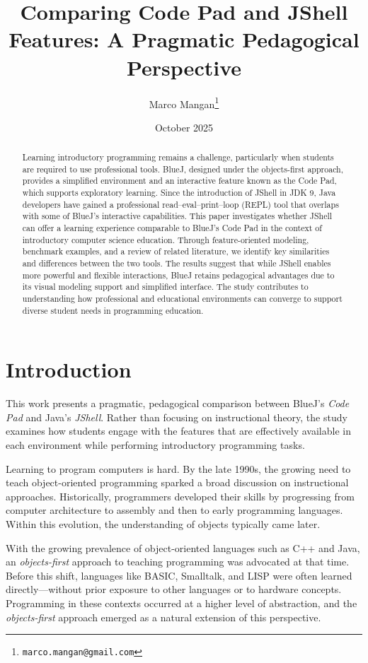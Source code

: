 \documentclass{article}
\title{Comparing Code Pad and JShell Features: A Pragmatic Pedagogical Perspective}
\author{Marco Mangan\thanks{\texttt{marco.mangan@gmail.com}}}
\date{October 2025}
\begin{document}
\maketitle

\begin{abstract}
Learning introductory programming remains a challenge, particularly when students are required to use professional tools. BlueJ, designed under the objects-first approach, provides a simplified environment and an interactive feature known as the Code Pad, which supports exploratory learning. Since the introduction of JShell in JDK 9, Java developers have gained a professional read–eval–print–loop (REPL) tool that overlaps with some of BlueJ’s interactive capabilities. This paper investigates whether JShell can offer a learning experience comparable to BlueJ’s Code Pad in the context of introductory computer science education. Through feature-oriented modeling, benchmark examples, and a review of related literature, we identify key similarities and differences between the two tools. The results suggest that while JShell enables more powerful and flexible interactions, BlueJ retains pedagogical advantages due to its visual modeling support and simplified interface. The study contributes to understanding how professional and educational environments can converge to support diverse student needs in programming education.
\end{abstract}

\section{Introduction}

This work presents a pragmatic, pedagogical comparison between BlueJ’s \textit{Code Pad} and Java’s \textit{JShell}. Rather than focusing on instructional theory, the study examines how students engage with the features that are effectively available in each environment while performing introductory programming tasks.

Learning to program computers is hard. By the late 1990s, the growing need to teach object-oriented programming sparked a broad discussion on instructional approaches. Historically, programmers developed their skills by progressing from computer architecture to assembly and then to early programming languages. Within this evolution, the understanding of objects typically came later.

With the growing prevalence of object-oriented languages such as C++ and Java, an \textit{objects-first} approach to teaching programming was advocated at that time. Before this shift, languages like BASIC, Smalltalk, and LISP were often learned directly—without prior exposure to other languages or to hardware concepts. Programming in these contexts occurred at a higher level of abstraction, and the \textit{objects-first} approach emerged as a natural extension of this perspective.
\end{document}
